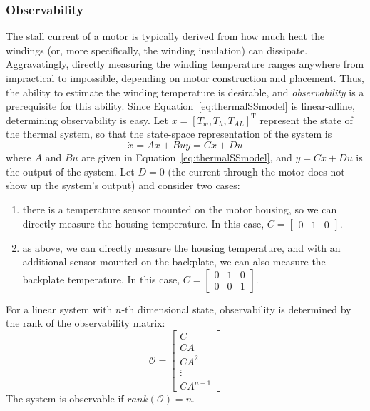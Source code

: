 \documentclass{report}
\begin{document}
\subsubsection[Observability]{Observability}
The stall current of a motor is typically derived from how much heat the windings (or, more specifically, the winding insulation) can dissipate. Aggravatingly, directly measuring the winding temperature ranges anywhere from impractical to impossible, depending on motor construction and placement. Thus, the ability to estimate the winding temperature is desirable, and \textit{observability} is a prerequisite for this ability. Since Equation~\ref{eq:thermalSSmodel} is linear-affine, determining observability is easy. Let $x = \left[T_{w},T_{h},T_{AL}\right]^{\text{T}}$ represent the state of the thermal system, so that the state-space representation of the system is 
\begin{subequations}
\begin{equation}
\dot{x} = Ax + Bu
\end{equation}
\begin{equation}
y = Cx + Du
\end{equation}
\end{subequations}
where $A$ and $Bu$ are given in Equation~\ref{eq:thermalSSmodel}, and $y = Cx + Du$ is the output of the system. Let $D = 0$ (the current through the motor does not show up the system's output) and consider two cases:
\begin{enumerate}
\item there is a temperature sensor mounted on the motor housing, so we can directly measure the housing temperature. In this case, $C = \begin{bmatrix}0 & 1 & 0 \end{bmatrix}$.
\item as above, we can directly measure the housing temperature, and with an additional sensor mounted on the backplate, we can also measure the backplate temperature. In this case, $C = \begin{bmatrix}0 & 1 & 0 \\ 0 & 0 & 1 \end{bmatrix}$.
\end{enumerate}

For a linear system with $n$-th dimensional state, observability is determined by the rank of the observability matrix: 
\begin{equation}
\mathcal{O} = 
\begin{bmatrix}
C \\
CA \\
CA^{2}\\
\vdots \\
CA^{n-1}
\end{bmatrix}
\end{equation}
The system is observable if $rank(\mathcal{O}) = n$.
\end{document}
